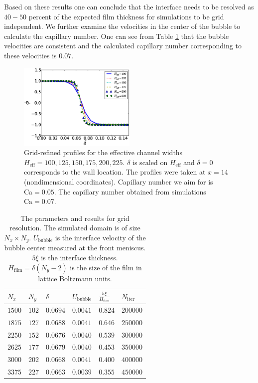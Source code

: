 \documentclass{CFD2011}
\newcommand{\Ca}{\mathrm{Ca}}
\begin{document}
Based on these results one can conclude
that
 the interface needs to be resolved as $40-50$ percent of the
expected film thickness for simulations to be grid independent. We further examine the
velocities in the center of the bubble to calculate the capillary number. One can see from Table
\ref{table:parameters:grid:refinement} that the bubble velocities are consistent and the
calculated capillary number corresponding to these velocities is $0.07$.
\begin{figure}[ht]
\includegraphics[width=0.5\textwidth]{Figures/norm_grid_profs.eps}
\caption{Grid-refined profiles for the effective
channel widths
$H_{\mathrm{eff}}=100,125,150,175,200,225$. $\delta$ is scaled on $H_{\mathrm{eff}}$ and $\delta=0$
corresponds to the wall location. The profiles were taken at $x=14$ (nondimensional coordinates).
Capillary number we aim for is $\Ca=0.05$. The capillary number obtained from simulations
$\Ca=0.07$. 
\label{fig:grid:profiles}}
\end{figure}
\begin{table}
\begin{tabularx}{0.5\textwidth}{|X|X|X|X|X|X|}
\hline
$N_x$&$N_y$&$\delta$&$U_\mathrm{bubble}$&$\frac{5\xi}{H_{\mathrm{film}}}$&$N_\mathrm{iter}$\\
\hline
$1500$&$102$&$0.0694$&$0.0041$&$0.824$&$200000$\\
\hline
$1875$&$127$&$0.0688$&$0.0041$&$0.646$&$250000$\\
\hline
$2250$&$152$&$0.0676$&$0.0040$&$0.539$&$300000$\\
\hline
$2625$&$177$&$0.0679$&$0.0040$&$0.453$&$350000$\\
\hline
$3000$&$202$&$0.0668$&$0.0041$&$0.400$&$400000$\\
\hline
$3375$&$227$&$0.0663$&$0.0039$&$0.355$&$450000$\\
\hline
\end{tabularx}
\caption{The parameters and results for grid resolution. The simulated domain is
of size $N_x \times N_y$. $U_\mathrm{bubble}$ is the interface velocity of the bubble center
measured at the front meniscus.  $5\xi$ is the interface thickness. $H_{\mathrm{film}}=\delta
(N_y-2)$ is the size of the film in
lattice Boltzmann units.
\label{table:parameters:grid:refinement}}
\end{table}
\end{document}
